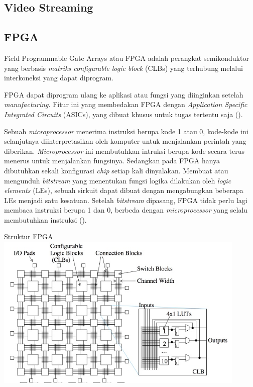 \subsection{Video Streaming}
\blindtext

\subsection{FPGA}
Field Programmable Gate Arrays atau FPGA adalah perangkat semikonduktor yang berbasis \textit{matriks configurable logic block} (CLBs) yang terhubung melalui interkoneksi yang dapat diprogram.

FPGA dapat diprogram ulang ke aplikasi atau fungsi yang diinginkan setelah \textit{manufacturing}. Fitur ini yang membedakan FPGA dengan \textit{Application Specific Integrated Circuits} (ASICs), yang dibuat khusus untuk tugas tertentu saja (\cite{XILINX}).

Sebuah \textit{microprocessor} menerima instruksi berupa kode 1 atau 0, kode-kode ini selanjutnya diinterpretasikan oleh komputer untuk menjalankan perintah yang diberikan. \textit{Microprocessor} ini membutuhkan intruksi berupa kode secara terus menerus untuk menjalankan fungsinya. Sedangkan pada FPGA hanya dibutuhkan sekali konfigurasi \textit{chip} setiap kali dinyalakan. Membuat atau mengunduh \textit{bitstream} yang menentukan fungsi logika dilakukan oleh \textit{logic elements} (LEs), sebuah sirkuit dapat dibuat dengan mengabungkan beberapa LEs menjadi satu kesatuan. Setelah \textit{bitstream} dipasang, FPGA tidak perlu lagi membaca instruksi berupa 1 dan 0, berbeda dengan \textit{microprocessor} yang selalu membutuhkan instruksi (\cite{pdf:cheung}).

\begin{afigure}{Struktur FPGA}
    \label{fig:fpga-structure}
    \includegraphics[width=12cm, center]{images/fpga-structure.jpeg}
\end{afigure}



